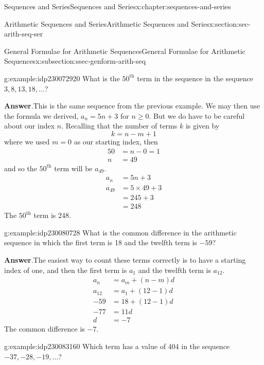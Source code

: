 \documentclass[twoside,10pt,]{book}
\newcommand{\blocktitlefont}{\relax}
\numberwithin{equation}{section}
\newcommand{\upth}[1]{{#1^{\text{th}}}}
\newcommand{\amp}{&}
\begin{document}
\begin{chapterptx}{Sequences and Series}{}{Sequences and Series}{}{}{x:chapter:sequences-and-series}
\begin{sectionptx}{Arithmetic Sequences and Series}{}{Arithmetic Sequences and Series}{}{}{x:section:sec-arith-seq-ser}
\begin{subsectionptx}{General Formulae for Arithmetic Sequences}{}{General Formulae for Arithmetic Sequences}{}{}{x:subsection:ssec-genform-arith-seq}
 \begin{example}{}{g:example:idp230072920}%
What is the \(\upth{50}\) term in the sequence in the sequence \(3, 8, 13, 18, \ldots\)?\par\smallskip%
\noindent\textbf{\blocktitlefont Answer}.\label{g:answer:idp230074968}{}\hypertarget{g:answer:idp230074968}{}\quad{}This is the same sequence from the previous example.  We may then use the  formula we derived, \(a_n = 5n + 3\) for \(n \ge 0\).  But we do have to be careful about our index \(n\).  Recalling that the number of terms \(k\) is given by%
\begin{equation*}
k=n-m+1
\end{equation*}
where we used \(m = 0\) as our starting index, then%
\begin{align*}
50 \amp = n-0=1\\
n\amp = 49
\end{align*}
and so the \(\upth{50}\) term will be \(a_{49}\).%
\begin{align*}
a_n \amp = 5n + 3\\
a_{49} \amp = 5 \times 49 + 3\\
\amp = 245 + 3\\
\amp =248
\end{align*}
The \(\upth{50}\) term is 248.\end{example}
 \begin{example}{}{g:example:idp230080728}%
What is the common difference in the arithmetic sequence in which the first term is 18 and the twelfth term is \(-59\)?\par\smallskip%
\noindent\textbf{\blocktitlefont Answer}.\label{g:answer:idp230083928}{}\hypertarget{g:answer:idp230083928}{}\quad{}The easiest way to count these terms correctly is to have a starting index of one, and then the first term is \(a_1\) and the twelfth term is \(a_{12}\).%
\begin{align*}
a_n \amp = a_m + \left( n - m \right)d\\
a_{12} \amp = a_1 + \left( 12 - 1 \right)d\\
-59 \amp = 18 + \left( 12 - 1 \right)d\\
-77 \amp = 11d\\
d\amp = -7
\end{align*}
The common difference is \(-7\).\end{example}
 \begin{example}{}{g:example:idp230083160}%
Which term has a value of 404 in the sequence \(-37, -28, -19, \ldots\)?\par\smallskip%

\end{example}
\end{subsectionptx}
\end{sectionptx}
\end{chapterptx}
\end{document}
